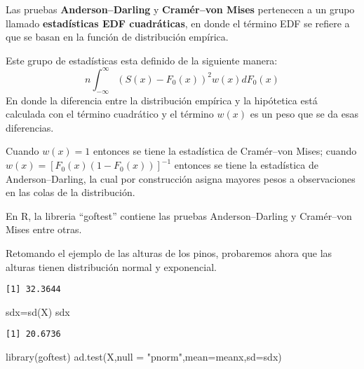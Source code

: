 \documentclass[
  a4paper,
  oneside,
  openany]{book}
\newenvironment{Shaded}{\begin{snugshade}}{\end{snugshade}}
\newcommand{\AttributeTok}[1]{\textcolor[rgb]{0.77,0.63,0.00}{#1}}
\newcommand{\FunctionTok}[1]{\textcolor[rgb]{0.00,0.00,0.00}{#1}}
\newcommand{\NormalTok}[1]{#1}
\newcommand{\OtherTok}[1]{\textcolor[rgb]{0.56,0.35,0.01}{#1}}
\newcommand{\SpecialCharTok}[1]{\textcolor[rgb]{0.00,0.00,0.00}{#1}}
\newcommand{\StringTok}[1]{\textcolor[rgb]{0.31,0.60,0.02}{#1}}
\begin{document}
Las pruebas \textbf{Anderson--Darling} y \textbf{Cramér--von Mises} pertenecen a un grupo llamado \textbf{estadísticas EDF cuadráticas}, en donde el término EDF se refiere a que se basan en la función de distribución empírica.

Este grupo de estadísticas esta definido de la siguiente manera:
\[n\int_{-\infty}^{\infty}(S(x)-F_0(x))^2w(x)dF_0(x)\]
En donde la diferencia entre la distribución empírica y la hipótetica está calculada con el término cuadrático y el término \(w(x)\) es un peso que se da esas diferencias.

Cuando \(w(x)=1\) entonces se tiene la estadística de Cramér--von Mises; cuando \(w(x)=[F_0(x)(1-F_0(x))]^{-1}\) entonces se tiene la estadística de Anderson--Darling, la cual por construcción asigna mayores pesos a observaciones en las colas de la distribución.

En R, la libreria ``goftest'' contiene las pruebas Anderson--Darling y Cramér--von Mises entre otras.

Retomando el ejemplo de las alturas de los pinos, probaremos ahora que las alturas tienen distribución normal y exponencial.

\begin{Shaded}
\end{Shaded}

\begin{verbatim}
[1] 32.3644
\end{verbatim}

\begin{Shaded}
\begin{Highlighting}[]
\NormalTok{sdx}\OtherTok{=}\FunctionTok{sd}\NormalTok{(X)}
\NormalTok{sdx}
\end{Highlighting}
\end{Shaded}

\begin{verbatim}
[1] 20.6736
\end{verbatim}

\begin{Shaded}
\begin{Highlighting}[]
\FunctionTok{library}\NormalTok{(goftest)}
\FunctionTok{ad.test}\NormalTok{(X,}\AttributeTok{null =} \StringTok{"pnorm"}\NormalTok{,}\AttributeTok{mean=}\NormalTok{meanx,}\AttributeTok{sd=}\NormalTok{sdx)}
\end{Highlighting}
\end{Shaded}
\end{document}
